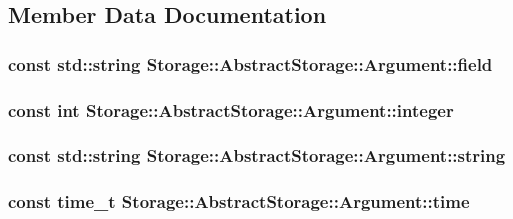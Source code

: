 \subsection{Member Data Documentation}
\hypertarget{structStorage_1_1AbstractStorage_1_1Argument_ad48a91372dd1a9445b4ddcee0bc8336a}{
\subsubsection[{field}]{\setlength{\rightskip}{0pt plus 5cm}const std::string {\bf Storage::AbstractStorage::Argument::field}}}
\label{d9/dc9/structStorage_1_1AbstractStorage_1_1Argument_ad48a91372dd1a9445b4ddcee0bc8336a}
\hypertarget{structStorage_1_1AbstractStorage_1_1Argument_a6b20329db4720c44c45d8380f840dbec}{
\subsubsection[{integer}]{\setlength{\rightskip}{0pt plus 5cm}const int {\bf Storage::AbstractStorage::Argument::integer}}}
\label{d9/dc9/structStorage_1_1AbstractStorage_1_1Argument_a6b20329db4720c44c45d8380f840dbec}
\hypertarget{structStorage_1_1AbstractStorage_1_1Argument_ab8ea8281cdefeb901a267261ed2e0478}{
\subsubsection[{string}]{\setlength{\rightskip}{0pt plus 5cm}const std::string {\bf Storage::AbstractStorage::Argument::string}}}
\label{d9/dc9/structStorage_1_1AbstractStorage_1_1Argument_ab8ea8281cdefeb901a267261ed2e0478}
\hypertarget{structStorage_1_1AbstractStorage_1_1Argument_ae6cc69656647a6cccf725a0156373a51}{
\subsubsection[{time}]{\setlength{\rightskip}{0pt plus 5cm}const time\_\-t {\bf Storage::AbstractStorage::Argument::time}}}
